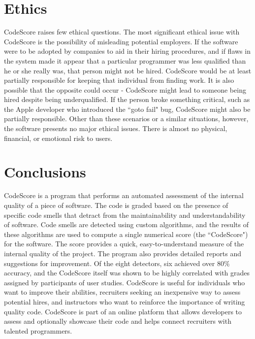\documentclass{sig-alternate}
\begin{document}
\section{Ethics}
CodeScore raises few ethical questions. The most significant ethical issue with CodeScore is the possibility of
misleading potential employers. If the software were to be adopted by companies to aid in
their hiring procedures, and if flaws in the system made it appear that a particular
programmer was less qualified than he or she really was, that person might not be
hired. CodeScore would be at least partially responsible for keeping that individual 
from finding work. It is also possible that the opposite could occur - CodeScore
might lead to someone being hired despite being underqualified. If the person
broke something critical, such as the Apple developer who introduced the ``goto
fail" bug, CodeScore might also be partially responsible.  Other than these
scenarios or a similar situations, however, the software presents no
major ethical issues. There is almost no physical, financial, or emotional risk to
users.

\section{Conclusions}
CodeScore is a program that performs an automated assessment of the internal
quality of a piece of software. The code is graded based on the presence of 
specific code smells that detract from the maintainability and understandability
of software. Code smells are detected using custom algorithms, and the results of these algorithms are
used to compute a single numerical score (the ``CodeScore") for the software.
The score provides a quick, easy-to-understand measure of the internal quality
of the project. The program also provides detailed reports and suggestions for improvement. Of the eight
detectors, six achieved over $80\%$ accuracy, and the CodeScore itself was shown
to be highly correlated with grades assigned by participants of user studies. CodeScore is useful for
individuals who want to improve their abilities, recruiters seeking an
inexpensive way to assess potential hires, and instructors who want to reinforce
the importance of writing quality code. CodeScore is part of an online platform that allows
developers to assess and optionally showcase their code and
helps connect recruiters with talented programmers. 
\end{document}
